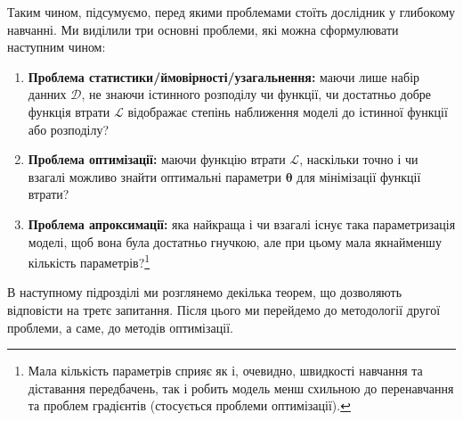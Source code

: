 Таким чином, підсумуємо, перед якими проблемами стоїть дослідник у глибокому
навчанні. Ми виділили три основні проблеми, які можна сформулювати наступним
чином: 
\begin{enumerate}
	\item \textbf{Проблема статистики/ймовірності/узагальнення:} маючи лише
	набір данних $\mathcal{D}$, не знаючи істинного розподілу чи функції, чи
	достатньо добре функція втрати $\mathcal{L}$ відображає степінь наближення
	моделі до істинної функції або розподілу?
	\item \textbf{Проблема оптимізації:} маючи функцію втрати $\mathcal{L}$,
	наскільки точно і чи взагалі можливо знайти оптимальні параметри
	$\boldsymbol{\theta}$ для мінімізації функції втрати?
	\item \textbf{Проблема апроксимації:} яка найкраща і чи взагалі існує така
	параметризація моделі, щоб вона була достатньо гнучкою, але при цьому мала
	якнайменшу кількість параметрів?\footnote{Мала кількість параметрів сприяє
	як і, очевидно, швидкості навчання та діставання передбачень, так і робить
	модель менш схильною до перенавчання та проблем градієнтів (стосується
	проблеми оптимізації).}
\end{enumerate}

В наступному підрозділі ми розглянемо декілька теорем, що дозволяють відповісти
на третє запитання. Після цього ми перейдемо до методології другої проблеми, а
саме, до методів оптимізації.
